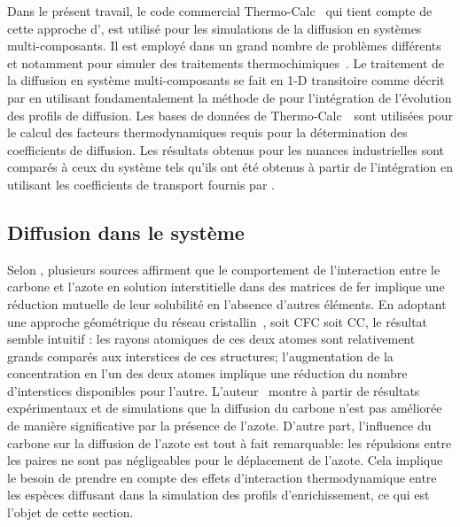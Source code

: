 Dans le présent travail, le code commercial Thermo-Calc~\cite{Andersson2002,Borgenstam2000} qui tient compte de cette approche d'\citet{Onsager1931}, est utilisé pour les simulations de la diffusion en systèmes multi-composants. Il est employé dans un grand nombre de problèmes différents et notamment pour simuler des traitements thermochimiques~\cite{Andersson2002,Borgenstam2000}.  Le traitement de la diffusion en système multi-composants se fait en 1-D transitoire comme décrit par \citet{Anderson1992} en utilisant fondamentalement la méthode de \citet{Agren1982} pour l'intégration de l'évolution des profils de diffusion. Les bases de données de Thermo-Calc~\cite{Andersson2002,Borgenstam2000} sont utilisées pour le calcul des facteurs thermodynamiques requis pour la détermination des coefficients de diffusion. Les résultats obtenus pour les nuances industrielles sont comparés à ceux du système  tels qu'ils ont été obtenus à partir de l'intégration en utilisant les coefficients de transport fournis par \citet{Slycke1981ii}.

\subsection{Diffusion dans le système }
\label{sec:integration_slycke}

Selon \citet{Yahia1995}, plusieurs sources affirment que le comportement de l'interaction entre le carbone et l'azote en solution interstitielle dans des matrices de fer implique une réduction mutuelle de leur solubilité en l'absence d'autres éléments. En adoptant une approche géométrique du réseau cristallin~\cite{Slycke1981ii,Yahia1995}, soit CFC soit CC, le résultat semble intuitif : les rayons atomiques de ces deux atomes sont relativement grands comparés aux interstices de ces structures; l'augmentation de la concentration en l'un des deux atomes implique une réduction du nombre d'interstices disponibles pour l'autre. L'auteur~\cite{Yahia1995} montre à partir de résultats expérimentaux et de simulations que la diffusion du carbone n'est pas améliorée de manière significative par la présence de l'azote. D'autre part, l'influence du carbone sur la diffusion de l'azote est tout à fait remarquable: les répulsions entre les paires  ne sont pas négligeables pour le déplacement de l'azote.  Cela implique le besoin de prendre en compte des effets d'interaction thermodynamique entre les espèces diffusant dans la simulation des profils d'enrichissement, ce qui est l'objet de cette section.

